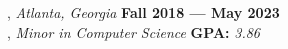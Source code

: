 \documentclass[letter,11pt]{article}
\begin{document}
, \textit{Atlanta, Georgia} \textbf{\hfill	Fall 2018 --- May 2023} \\
, \textit{Minor in Computer Science} \textbf{\hfill GPA:} \textit{3.86}
\end{document}
